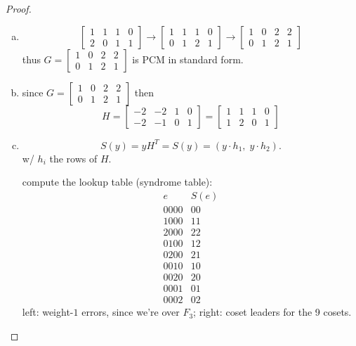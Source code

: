 \documentclass{article}
\theoremstyle{definition}
\begin{document}
\begin{proof}
  \begin{enumerate}[(a)]
    \item
      $$
      \begin{bmatrix}
        1 & 1 & 1 & 0 \\
        2 & 0 & 1 & 1
      \end{bmatrix}
      \rightarrow
      \begin{bmatrix}
        1 & 1 & 1 & 0 \\
        0 & 1 & 2 & 1
      \end{bmatrix}
      \rightarrow
      \begin{bmatrix}
        1 & 0 & 2 & 2 \\
        0 & 1 & 2 & 1
      \end{bmatrix}
      $$
      thus $
      G=\begin{bmatrix}
        1 & 0 & 2 & 2 \\
        0 & 1 & 2 & 1
      \end{bmatrix}
      $ is PCM in standard form.

    \item
      since $
      G=\begin{bmatrix}
        1 & 0 & 2 & 2 \\
        0 & 1 & 2 & 1
      \end{bmatrix}
      $
      then
      $$
      H =
      \begin{bmatrix}
        -2 & -2 & 1 & 0 \\
        -2 & -1 & 0 & 1
      \end{bmatrix}
      =
      \begin{bmatrix}
        1 & 1 & 1 & 0 \\
        1 & 2 & 0 & 1
      \end{bmatrix}
      $$

    \item
      $$
      S(y) = y H^T=S(y) = (y \cdot h_1,\; y \cdot h_2).
      $$
      w/ $h_i$ the rows of $H$.

      compute the lookup table (syndrome table):
      $$
      \begin{array}{c|c}
        e & S(e) \\
        \hline
        0000 & 00 \\
        1000 & 11 \\
        2000 & 22 \\
        0100 & 12 \\
        0200 & 21 \\
        0010 & 10 \\
        0020 & 20 \\
        0001 & 01 \\
        0002 & 02
      \end{array}
      $$
      left: weight-$1$ errors, since we're over $F_3$; right: coset leaders for the 9 cosets.


\end{enumerate}
\end{proof}
\end{document}
